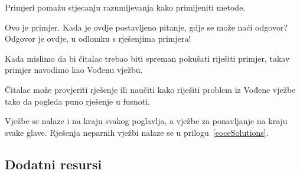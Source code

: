 \noindent%
Primjeri pomažu stjecanju razumijevanja kako primijeniti metode.

\begin{examplewrap}
\begin{nexample}{Ovo je primjer.
  Kada je ovdje postavljeno pitanje, gdje se može naći odgovor?}
  Odgovor je ovdje, u odlomku s rješenjima primjera!
\end{nexample}
\end{examplewrap}

\noindent%
Kada mislimo da bi čitalac trebao biti spreman pokušati
riješiti primjer, takav primjer navodimo kao Vođenu vježbu.

\begin{exercisewrap}
\begin{nexercise}
Čitalac može provjeriti rješenje ili naučiti kako riješiti problem iz Vođene vježbe
tako da pogleda puno rješenje u fusnoti.\footnotemark{}
\end{nexercise}
\end{exercisewrap}

\noindent%
Vježbe se nalaze i na kraju svakog poglavlja, a vježbe za ponavljanje na kraju svake glave.
Rješenja neparnih vježbi nalaze se u prilogu~\ref{eoceSolutions}.


\subsection*{{\color{oiB}Dodatni resursi}}

